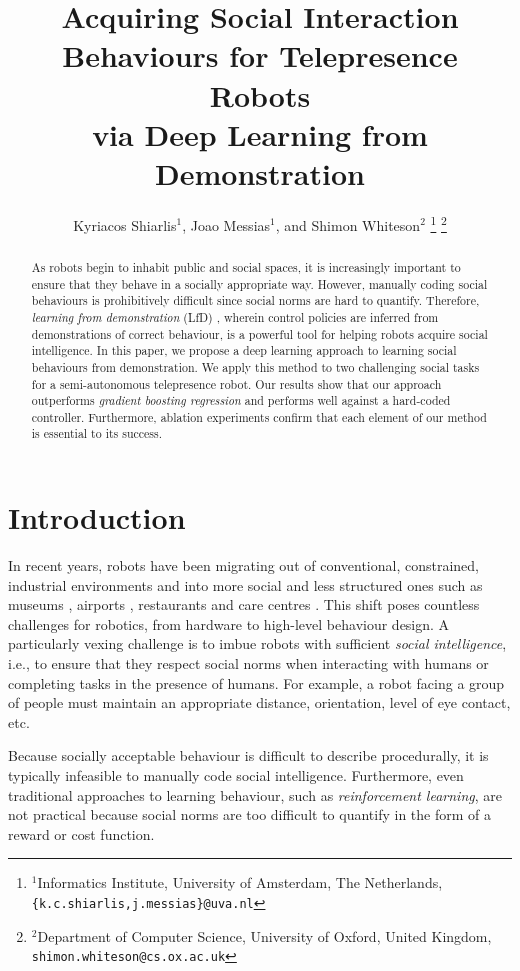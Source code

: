 \documentclass[letterpaper, 10 pt, conference]{ieeeconf}
\title{\LARGE \bf
Acquiring Social Interaction Behaviours for Telepresence Robots\\via Deep Learning from Demonstration 
}
\author{Kyriacos Shiarlis$^{1}$, Joao Messias$^{1}$, and Shimon Whiteson$^{2}$%
\thanks{$^{1}$Informatics Institute, University of Amsterdam, The Netherlands,
         {\tt\small \{k.c.shiarlis,j.messias\}@uva.nl}}%
\thanks{$^{2}$Department of Computer Science, University of Oxford, United Kingdom,
         {\tt\small shimon.whiteson@cs.ox.ac.uk}}%
}
\begin{document}
\maketitle

\thispagestyle{empty}
\pagestyle{empty}


\begin{abstract}
As robots begin to inhabit public and social spaces, it is increasingly important to ensure that they behave in a socially appropriate way. However, manually coding social behaviours is prohibitively difficult since social norms are hard to quantify.  Therefore, \emph{learning from demonstration} (LfD) \cite{argall2009survey}, wherein control policies are inferred from demonstrations of correct behaviour, is a powerful tool for helping robots acquire social intelligence. In this paper, we propose a deep learning approach to learning social behaviours from demonstration.  We apply this method to two challenging social tasks for a semi-autonomous telepresence robot.  Our results show that our approach outperforms \emph{gradient boosting regression} and performs well against a hard-coded controller.  Furthermore, ablation experiments confirm that each element of our method is essential to its success.
\end{abstract}

\section{Introduction}


In recent years, robots have been migrating out of conventional, constrained, industrial environments and into more social and less structured ones such as museums \cite{thrun1999minerva}, airports \cite{triebel2015spencer}, restaurants \cite{qing2010research} and care centres \cite{shiarlis2015teresa}. This shift poses countless challenges for robotics, from hardware  to high-level behaviour design.  A particularly vexing challenge is to imbue robots with sufficient \emph{social intelligence}, i.e., to ensure that they respect social norms when interacting with humans or completing tasks in the presence of humans.  For example, a robot facing a group of people must maintain an appropriate distance, orientation, level of eye contact, etc.

Because socially acceptable behaviour is difficult to describe procedurally, it is typically infeasible to manually code social intelligence.  Furthermore, even traditional approaches to learning behaviour, such as \emph{reinforcement learning}, are not practical because social norms are too difficult to quantify in the form of a reward or cost function.
\end{document}
